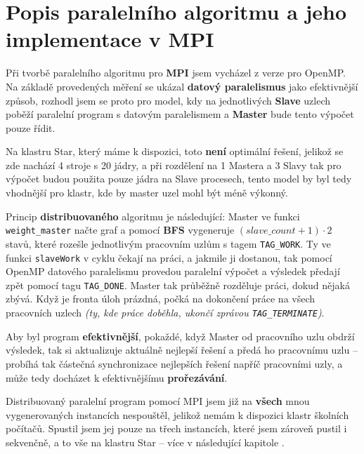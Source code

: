 \section{Popis paralelního algoritmu a jeho implementace v MPI}

Při tvorbě paralelního algoritmu pro \textbf{MPI} jsem vycházel z verze pro OpenMP. Na základě provedených měření se ukázal \textbf{datový paralelismus} jako efektivnější způsob, rozhodl jsem se proto pro model, kdy na jednotlivých \textbf{Slave} uzlech poběží paralelní program s datovým paralelismem a \textbf{Master} bude tento výpočet pouze řídit.

Na klastru Star, který máme k dispozici, toto \textbf{není} optimální řešení, jelikož se zde nachází 4 stroje s 20 jádry, a při rozdělení na 1 Mastera a 3 Slavy tak pro výpočet budou použita pouze jádra na Slave procesech, tento model by byl tedy vhodnější pro klastr, kde by master uzel mohl být méně výkonný.

Princip \textbf{distribuovaného} algoritmu je následující: Master ve funkci \texttt{weight_master} načte graf a pomocí \textbf{BFS} vygeneruje $(slave\_count + 1) \cdot 2$ stavů, které rozešle jednotlivým pracovním uzlům s tagem \texttt{TAG_WORK}. Ty ve funkci \texttt{slaveWork} v cyklu čekají na práci, a jakmile ji dostanou, tak pomocí OpenMP datového paralelismu provedou paralelní výpočet a výsledek předají zpět pomocí tagu \texttt{TAG_DONE}. Master tak průběžně rozděluje práci, dokud nějaká zbývá. Když je fronta úloh prázdná, počká na dokončení práce na všech pracovních uzlech \textit{(ty, kde práce doběhla, ukončí zprávou \texttt{TAG_TERMINATE})}.

Aby byl program \textbf{efektivnější}, pokaždé, když Master od pracovního uzlu obdrží výsledek, tak si aktualizuje aktuálně nejlepší řešení a předá ho pracovnímu uzlu -- probíhá tak částečná synchronizace nejlepších řešení napříč pracovními uzly, a může tedy docházet k efektivnějšímu \textbf{prořezávání}.

Distribuovaný paralelní program pomocí MPI jsem již na \textbf{všech} mnou vygenerovaných instancích nespouštěl, jelikož nemám k dispozici klastr školních počítačů. Spustil jsem jej pouze na třech instancích, které jsem zároveň pustil i sekvenčně, a to vše na klastru Star -- více v následující kapitole .